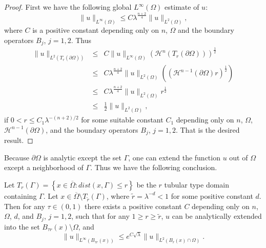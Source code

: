\documentclass[a4paper, 12pt, onecolumn]{article} \textwidth 148mm
\begin{document}
\begin{proof}
First we have the following global $L^{\infty}(\Omega)$ estimate of $u$:
\begin{equation}\label{standard elliptic estiamte}
\|u\|_{L^{\infty}(\Omega)}\leq C\lambda^{\frac{n+2}{4}}\|u\|_{L^2(\Omega)},
\end{equation}
where $C$ is a positive constant depending only on $n$, $\Omega$ and the boundary operators $B_j$,
$j=1,2$.
Thus
\begin{eqnarray*}
\|u\|_{L^2(T_r(\partial\Omega))}&\leq&C\|u\|_{L^{\infty}(\Omega)}(\mathcal{H}^n(T_r(\partial\Omega)))^{\frac{1}{2}}
\\&\leq&C\lambda^{\frac{n+2}{4}}\|u\|_{L^2(\Omega)}((\mathcal{H}^{n-1}(\partial\Omega)r)^{\frac{1}{2}})
\\&\leq&C\lambda^{\frac{n+2}{4}}\|u\|_{L^2(\Omega)}r^{\frac{1}{2}}
\\&\leq&\frac{1}{2}\|u\|_{L^2(\Omega)},
\end{eqnarray*}
if $0<r\leq C_1\lambda^{-(n+2)/2}$ for some suitable constant $C_1$ depending only on $n$, $\Omega$, $\mathcal{H}^{n-1}(\partial\Omega)$, and the boundary operators $B_j$, $j=1,2$. That is the desired result.
\end{proof}

Because $\partial\Omega$ is analytic except the set $\Gamma$, one can extend the function $u$ out of $\Omega$ except a neighborhood of $\Gamma$. Thus we have the following conclusion.

\begin{lemma}\label{extending}
Let $T_{r}(\Gamma)=\left\{x\in\overline{\Omega}:dist(x,\Gamma)\leq r\right\}$ be the $r$ tubular type domain containing  $\Gamma$.
Let $x\in\overline{\Omega}\setminus T_{\widetilde{r}}(\Gamma)$, where $\widetilde{r}=\lambda^{-d}<1$ for some positive constant $d$. Then for any $\tau\in(0,1)$ there exists a positive constant $C$ depending only on $n$, $\Omega$, $d$, and $B_j$, $j=1,2$, such that for any $1\geq r\geq\widetilde{r}$, $u$ can be analytically
extended into the set $B_{\tau r}(x)\setminus\Omega$, and
\begin{equation}
\|u\|_{L^{\infty}(B_{\tau r}(x))}\leq e^{C\sqrt{\lambda}}\|u\|_{L^2(B_{r}(x)\cap\Omega)}.
\end{equation}

\end{lemma}
\end{document}
